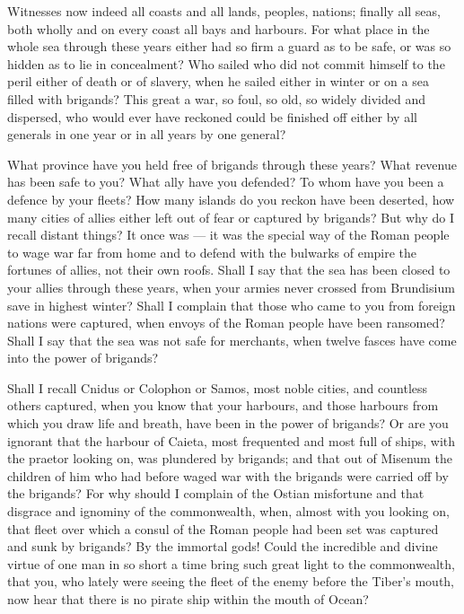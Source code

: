  Witnesses now indeed all coasts and all lands, peoples, nations; finally all seas, both wholly and on every coast all bays and harbours. For what place in the whole sea through these years either had so firm a guard as to be safe, or was so hidden as to lie in concealment? Who sailed who did not commit himself to the peril either of death or of slavery, when he sailed either in winter or on a sea filled with brigands? This great a war, so foul, so old, so widely divided and dispersed, who would ever have reckoned could be finished off either by all generals in one year or in all years by one general?

 What province have you held free of brigands through these years? What revenue has been safe to you? What ally have you defended? To whom have you been a defence by your fleets? How many islands do you reckon have been deserted, how many cities of allies either left out of fear or captured by brigands? But why do I recall distant things? It once was --- it was the special way of the Roman people to wage war far from home and to defend with the bulwarks of empire the fortunes of allies, not their own roofs. Shall I say that the sea has been closed to your allies through these years, when your armies never crossed from Brundisium save in highest winter? Shall I complain that those who came to you from foreign nations were captured, when envoys of the Roman people have been ransomed? Shall I say that the sea was not safe for merchants, when twelve fasces have come into the power of brigands?

 Shall I recall Cnidus or Colophon or Samos, most noble cities, and countless others captured, when you know that your harbours, and those harbours from which you draw life and breath, have been in the power of brigands? Or are you ignorant that the harbour of Caieta, most frequented and most full of ships, with the praetor looking on, was plundered by brigands; and that out of Misenum the children of him who had before waged war with the brigands were carried off by the brigands? For why should I complain of the Ostian misfortune and that disgrace and ignominy of the commonwealth, when, almost with you looking on, that fleet over which a consul of the Roman people had been set was captured and sunk by brigands? By the immortal gods! Could the incredible and divine virtue of one man in so short a time bring such great light to the commonwealth, that you, who lately were seeing the fleet of the enemy before the Tiber's mouth, now hear that there is no pirate ship within the mouth of Ocean?


